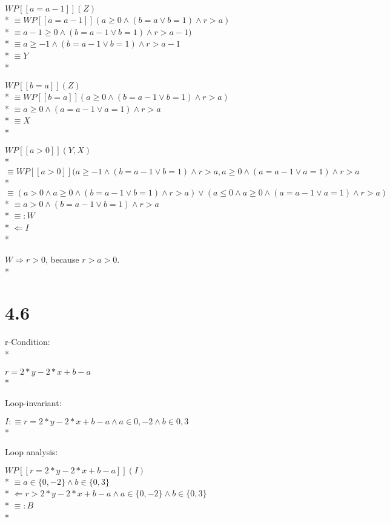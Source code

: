 \documentclass{article}
\begin{document}
$ WP[\![a=a-1]\!](Z) $ \\*
$ \equiv WP[\![a=a-1]\!](a \ge 0 \land (b=a \lor b=1) \land r>a) $ \\*
$ \equiv a-1 \ge 0 \land (b=a-1 \lor b=1) \land r>a-1) $ \\*
$ \equiv a \ge -1 \land (b=a-1 \lor b=1) \land r>a-1 $ \\*
$ \equiv Y $ \\*

$ WP[\![b=a]\!](Z) $ \\*
$ \equiv WP[\![b=a]\!](a \ge 0 \land (b=a-1 \lor b=1) \land r>a) $ \\*
$ \equiv a \ge 0 \land (a=a-1 \lor a=1) \land r>a $ \\*
$ \equiv X $ \\*

$ WP[\![a>0]\!](Y, X) $ \\*
$ \equiv WP[\![a>0]\!](a \ge -1 \land (b=a-1 \lor b=1) \land r>a, a \ge 0 \land (a=a-1 \lor a=1) \land r>a $ \\*
$ \equiv (a>0 \land a \ge 0 \land (b=a-1 \lor b=1) \land r>a) \lor (a \le 0 \land a \ge 0 \land (a=a-1 \lor a=1) \land r>a ) $ \\*
$ \equiv a>0 \land (b=a-1 \lor b=1) \land r>a $ \\*
$ \equiv: W $ \\*
$ \Leftarrow I $ \\*

$ W \Rightarrow r>0 $, because $r>a>0$. \\*

\section*{4.6}

r-Condition: \\*

$ r=2*y-2*x+b-a $ \\*

Loop-invariant:

$ I:\equiv r=2*y-2*x+b-a \land a \in {0, -2} \land b\in {0, 3} $ \\*

Loop analysis:

$ WP[\![r=2*y-2*x+b-a]\!](I) $ \\*
$ \equiv a \in \{0,-2\} \land b \in \{0,3\} $ \\*
$ \Leftarrow r>2*y-2*x+b-a \land a \in \{0,-2\} \land b \in \{0,3\} $ \\*
$ \equiv: B $ \\*
\end{document}
